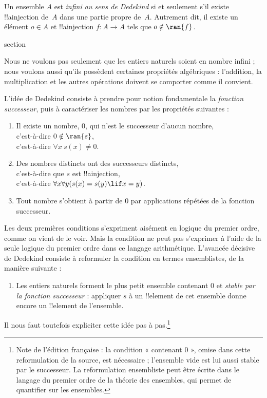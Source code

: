 \documentclass[11pt,a4paper,openany]{memoir}
\begin{document}
\begin{defn}
Un ensemble $A$ est \emph{infini au sens de Dedekind} si et seulement
s'il existe !!a{injection} de~$A$ dans une partie propre de~$A$.
Autrement dit, il existe un élément $o \in A$ et !!a{injection}
$f \colon A \to A$ tels que $o \notin \ran{f}$.
\end{defn}


\endgroup


\begingroup
\expandafter\def\csname ol@sectioncs\endcsname{section}
\def\olfilename{dedekind-algebra}



Nous ne voulons pas seulement que les entiers naturels soient en nombre
infini ; nous voulons aussi qu'ils possèdent certaines propriétés
algébriques : l'addition, la multiplication et les autres opérations
doivent se comporter comme il convient.

L'idée de Dedekind consiste à prendre pour notion fondamentale la
\emph{fonction successeur}, puis à caractériser les nombres par les
propriétés suivantes :
\begin{enumerate}
	\item Il existe un nombre, $0$, qui n'est le successeur d'aucun nombre,
	\\c'est-à-dire $0 \notin \ran{s}$,
	\\c'est-à-dire $\forall x\ s(x) \neq 0$.
	\item Des nombres distincts ont des successeurs distincts,
	\\c'est-à-dire que $s$ est !!a{injection},
	\\c'est-à-dire $\forall x \forall y (s(x) = s(y) \lif x = y)$.
	\item{} Tout nombre s'obtient à partir de
	$0$ par applications répétées de la fonction successeur.
\end{enumerate}
Les deux premières conditions s'expriment aisément en logique du premier
ordre, comme on vient de le voir. Mais la condition
 ne peut pas s'exprimer à l'aide de la seule
logique du premier ordre dans ce langage arithmétique. L'avancée décisive
de Dedekind consiste à reformuler la condition
 en termes ensemblistes, de la manière suivante :
\begin{enumerate}
	\item[3$'$.] Les entiers naturels forment le plus petit ensemble
	contenant $0$ et \emph{stable par la fonction successeur} :
	appliquer $s$ à un !!{element} de cet ensemble donne encore
	un !!{element} de l'ensemble.
\end{enumerate}
Il nous faut toutefois expliciter cette idée pas à pas.\footnote{Note de
l'édition française : la condition « contenant $0$ », omise dans cette
reformulation de la source, est nécessaire ; l'ensemble vide est lui aussi
stable par le successeur. La reformulation ensembliste peut être écrite
dans le langage du premier ordre de la théorie des ensembles, qui permet
de quantifier sur les ensembles.}
\end{document}
